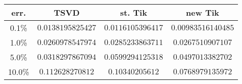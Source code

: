 \begin{tabular} { c | c | c | c }
err. & TSVD & st. Tik & new Tik \\ \hline 
0.1\% & $0.0138195825427$ & $0.0116105396417$ & $0.00983516140485$ \\
1.0\% & $0.0260978547974$ & $0.0285233863711$ & $0.0267510907107$ \\
5.0\% & $0.0318297867094$ & $0.0599294125318$ & $0.0497013382702$ \\
10.0\% & $0.112628270812$ & $0.10340205612$ & $0.0768979135972$ \\
\end{tabular}
